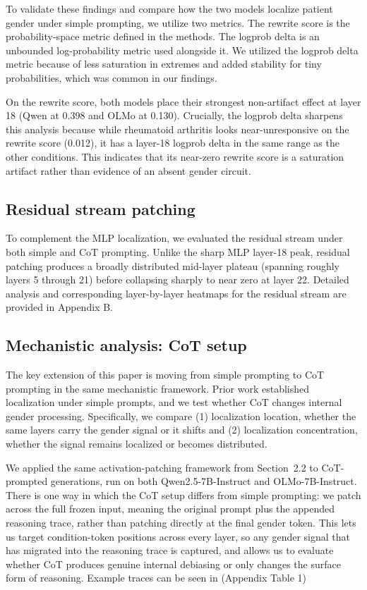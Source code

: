 \documentclass{article}
\begin{document}
To validate these findings and compare how the two models localize patient gender under simple prompting, we utilize two metrics. The rewrite score is the probability-space metric defined in the methods. The logprob delta is an unbounded log-probability metric used alongside it. We utilized the logprob delta metric because of less saturation in extremes and added stability for tiny probabilities, which was common in our findings.

On the rewrite score, both models place their strongest non-artifact effect at layer 18 (Qwen at 0.398 and OLMo at 0.130). Crucially, the logprob delta sharpens this analysis because while rheumatoid arthritis looks near-unresponsive on the rewrite score (0.012), it has a layer-18 logprob delta in the same range as the other conditions. This indicates that its near-zero rewrite score is a saturation artifact rather than evidence of an absent gender circuit.

\subsection{Residual stream patching}
To complement the MLP localization, we evaluated the residual stream under both simple and CoT prompting. Unlike the sharp MLP layer-18 peak, residual patching produces a broadly distributed mid-layer plateau (spanning roughly layers 5 through 21) before collapsing sharply to near zero at layer 22. Detailed analysis and corresponding layer-by-layer heatmaps for the residual stream are provided in Appendix B.


\subsection{Mechanistic analysis: CoT setup}
The key extension of this paper is moving from simple prompting to CoT prompting in the same mechanistic framework. Prior work established localization under simple prompts, and we test whether CoT changes internal gender processing. Specifically, we compare (1) localization location, whether the same layers carry the gender signal or it shifts and (2) localization concentration, whether the signal remains localized or becomes distributed.

We applied the same activation-patching framework from Section~2.2 to CoT-prompted generations, run on both Qwen2.5-7B-Instruct and OLMo-7B-Instruct. There is one way in which the CoT setup differs from simple prompting: we patch across the full frozen input, meaning the original prompt plus the appended reasoning trace, rather than patching directly at the final gender token. This lets us target condition-token positions across every layer, so any gender signal that has migrated into the reasoning trace is captured, and allows us to evaluate whether CoT produces genuine internal debiasing or only changes the surface form of reasoning. Example traces can be seen in (Appendix Table 1)
\end{document}
